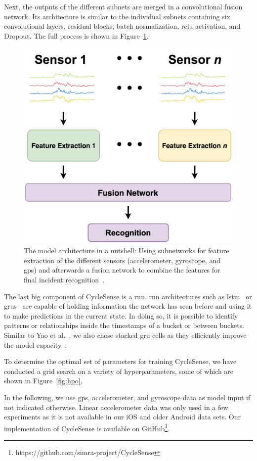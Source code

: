 Next, the outputs of the different subnets are merged in a convolutional fusion network. 
Its architecture is similar to the individual subnets containing six convolutional layers, residual blocks, batch normalization, \ac{relu} activation, and Dropout. 
The full process is shown in Figure~\ref{fig:sfn}.

\begin{figure}[t]
\centering
    \includegraphics[width=0.4\columnwidth]{fig/sensor-and-fusion-networks.png}
    \caption{The model architecture in a nutshell: Using subnetworks for feature extraction of the different sensors (accelerometer, gyroscope, and \ac{gps}) and afterwards a fusion network to combine the features for final incident recognition~\cite{chen2021deep}.}
    \label{fig:sfn}
\end{figure}

The last big component of CycleSense is a \ac{rnn}.
\ac{rnn} architectures such as \ac{lstm}~\cite{hochreiter1997long} or \acp{gru}~\cite{chung2014empirical} are capable of holding information the network has seen before and using it to make predictions in the current state. 
In doing so, it is possible to identify patterns or relationships inside the timestamps of a bucket or between buckets. 
Similar to Yao et al.\ \cite{yao2017deepsense}, we also chose stacked \ac{gru} cells as they efficiently improve the model capacity~\cite{goodfellow2016deep}.

To determine the optimal set of parameters for training CycleSense, we have conducted a grid search on a variety of hyperparameters, some of which are shown in Figure~\ref{fig:hpo}.

In the following, we use \ac{gps}, accelerometer, and gyroscope data as model input if not indicated otherwise.  
Linear accelerometer data was only used in a few experiments as it is not available in our iOS and older Android data sets.
Our implementation of CycleSense is available on GitHub\footnote{https://github.com/simra-project/CycleSense}.

